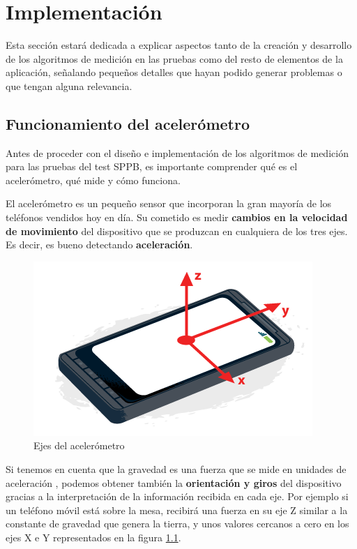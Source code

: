 \chapter{Implementación}

Esta sección estará dedicada a explicar aspectos tanto de la creación y desarrollo de los algoritmos de medición en las pruebas como del resto de elementos de la aplicación, señalando pequeños detalles que hayan podido generar problemas o que tengan alguna relevancia.

\section{Funcionamiento del acelerómetro}
\label{sec:acc}

Antes de proceder con el diseño e implementación de los algoritmos de medición para las pruebas del test SPPB, es importante comprender qué es el acelerómetro, qué mide y cómo funciona.

El acelerómetro es un pequeño sensor que incorporan la gran mayoría de los teléfonos vendidos hoy en día. Su cometido es medir \textbf{cambios en la velocidad de movimiento} del dispositivo que se produzcan en cualquiera de los tres ejes. Es decir, es bueno detectando \textbf{aceleración}.

\begin{figure}[H]
	\centering
	\includegraphics[scale=0.4]{imagenes/axes_mobile.png}
	\caption{Ejes del acelerómetro\label{fig:ejes_acc} \cite{PeteLepage}}
\end{figure}

Si tenemos en cuenta que la gravedad es una fuerza que se mide en unidades de aceleración \cite{gravedad}, podemos obtener también la \textbf{orientación y giros} del dispositivo gracias a la interpretación de la información recibida en cada eje. Por ejemplo si un teléfono móvil está sobre la mesa, recibirá una fuerza en su eje Z similar a la constante de gravedad que genera la tierra, y unos valores cercanos a cero en los ejes X e Y representados en la figura \ref{fig:ejes_acc}.


